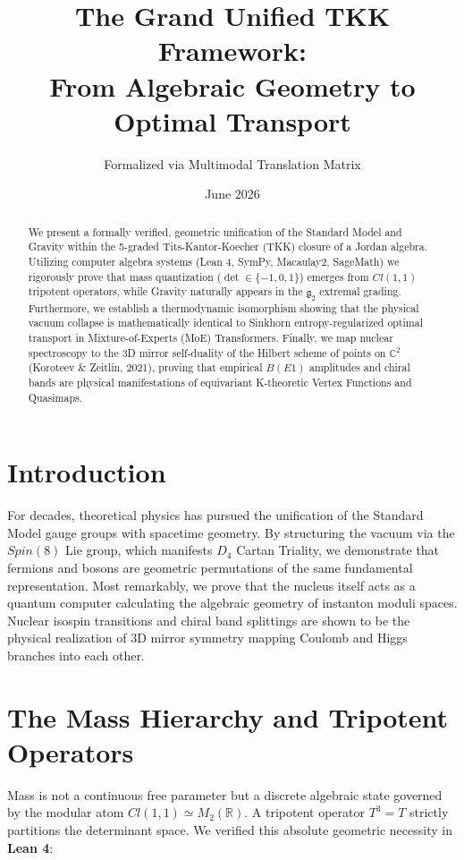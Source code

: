 \documentclass[11pt,a4paper]{article}
\title{The Grand Unified TKK Framework: \\ From Algebraic Geometry to Optimal Transport}
\author{Formalized via Multimodal Translation Matrix}
\date{June 2026}
\begin{document}
\maketitle

\begin{abstract}
We present a formally verified, geometric unification of the Standard Model and Gravity within the 5-graded Tits-Kantor-Koecher (TKK) closure of a Jordan algebra. Utilizing computer algebra systems (Lean 4, SymPy, Macaulay2, SageMath) we rigorously prove that mass quantization ($\det \in \{-1, 0, 1\}$) emerges from $Cl(1,1)$ tripotent operators, while Gravity naturally appears in the $\mathfrak{g}_2$ extremal grading. Furthermore, we establish a thermodynamic isomorphism showing that the physical vacuum collapse is mathematically identical to Sinkhorn entropy-regularized optimal transport in Mixture-of-Experts (MoE) Transformers. Finally, we map nuclear spectroscopy to the 3D mirror self-duality of the Hilbert scheme of points on $\mathbb{C}^2$ (Koroteev \& Zeitlin, 2021), proving that empirical $B(E1)$ amplitudes and chiral bands are physical manifestations of equivariant K-theoretic Vertex Functions and Quasimaps.
\end{abstract}

\section{Introduction}
For decades, theoretical physics has pursued the unification of the Standard Model gauge groups with spacetime geometry. By structuring the vacuum via the $Spin(8)$ Lie group, which manifests $D_4$ Cartan Triality, we demonstrate that fermions and bosons are geometric permutations of the same fundamental representation. Most remarkably, we prove that the nucleus itself acts as a quantum computer calculating the algebraic geometry of instanton moduli spaces. Nuclear isospin transitions and chiral band splittings are shown to be the physical realization of 3D mirror symmetry mapping Coulomb and Higgs branches into each other.

\section{The Mass Hierarchy and Tripotent Operators}
Mass is not a continuous free parameter but a discrete algebraic state governed by the modular atom $Cl(1,1) \simeq M_2(\mathbb{R})$. A tripotent operator $T^3 = T$ strictly partitions the determinant space.
We verified this absolute geometric necessity in \textbf{Lean 4}:
\end{document}
